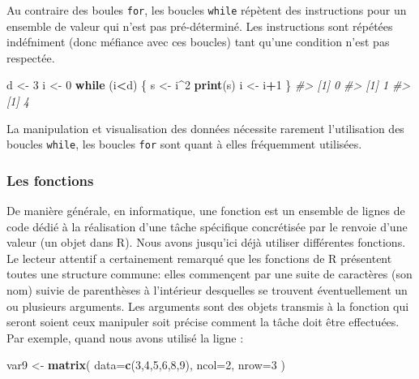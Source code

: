 \documentclass[]{article}
\newenvironment{Shaded}{\begin{snugshade}}{\end{snugshade}}
\newcommand{\CommentTok}[1]{\textcolor[rgb]{0.56,0.35,0.01}{\textit{#1}}}
\newcommand{\ControlFlowTok}[1]{\textcolor[rgb]{0.13,0.29,0.53}{\textbf{#1}}}
\newcommand{\DataTypeTok}[1]{\textcolor[rgb]{0.13,0.29,0.53}{#1}}
\newcommand{\DecValTok}[1]{\textcolor[rgb]{0.00,0.00,0.81}{#1}}
\newcommand{\KeywordTok}[1]{\textcolor[rgb]{0.13,0.29,0.53}{\textbf{#1}}}
\newcommand{\NormalTok}[1]{#1}
\newcommand{\OperatorTok}[1]{\textcolor[rgb]{0.81,0.36,0.00}{\textbf{#1}}}
\newcommand{\StringTok}[1]{\textcolor[rgb]{0.31,0.60,0.02}{#1}}
\begin{document}
Au contraire des boules \texttt{for}, les boucles \texttt{while} répètent des instructions pour un ensemble de valeur qui n'est pas pré-déterminé. Les instructions sont répétées indéfniment (donc méfiance avec ces boucles) tant qu'une condition n'est pas respectée.

\begin{Shaded}
\begin{Highlighting}[]
\NormalTok{d <-}\StringTok{ }\DecValTok{3}
\NormalTok{i <-}\StringTok{ }\DecValTok{0}
\ControlFlowTok{while}\NormalTok{ (i}\OperatorTok{<}\NormalTok{d) \{}
\NormalTok{  s <-}\StringTok{ }\NormalTok{i}\OperatorTok{^}\DecValTok{2}
  \KeywordTok{print}\NormalTok{(s)}
\NormalTok{  i <-}\StringTok{ }\NormalTok{i}\OperatorTok{+}\DecValTok{1}
\NormalTok{\}}
\CommentTok{#> [1] 0}
\CommentTok{#> [1] 1}
\CommentTok{#> [1] 4}
\end{Highlighting}
\end{Shaded}

La manipulation et visualisation des données nécessite rarement l'utilisation des boucles \texttt{while}, les boucles \texttt{for} sont quant à elles fréquemment utilisées.

\hypertarget{les-fonctions}{%
\subsubsection*{Les fonctions}\label{les-fonctions}}

De manière générale, en informatique, une fonction est un ensemble de lignes de code dédié à la réalisation d'une tâche spécifique concrétisée par le renvoie d'une valeur (un objet dans R). Nous avons jusqu'ici déjà utiliser différentes fonctions. Le lecteur attentif a certainement remarqué que les fonctions de R présentent toutes une structure commune: elles commençent par une suite de caractères (son nom) suivie de parenthèses à l'intérieur desquelles se trouvent éventuellement un ou plusieurs arguments. Les arguments sont des objets transmis à la fonction qui seront soient ceux manipuler soit précise comment la tâche doit être effectuées. Par exemple, quand nous avons utilisé la ligne :

\begin{Shaded}
\begin{Highlighting}[]
\NormalTok{var9 <-}\StringTok{ }\KeywordTok{matrix}\NormalTok{(}
  \DataTypeTok{data=}\KeywordTok{c}\NormalTok{(}\DecValTok{3}\NormalTok{,}\DecValTok{4}\NormalTok{,}\DecValTok{5}\NormalTok{,}\DecValTok{6}\NormalTok{,}\DecValTok{8}\NormalTok{,}\DecValTok{9}\NormalTok{),}
  \DataTypeTok{ncol=}\DecValTok{2}\NormalTok{,}
  \DataTypeTok{nrow=}\DecValTok{3}
\NormalTok{  )}
\end{Highlighting}
\end{Shaded}
\end{document}
